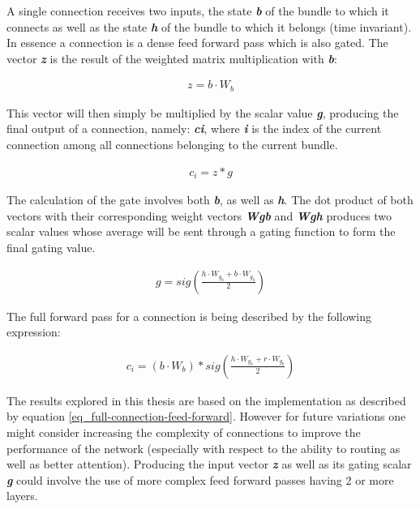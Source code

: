 A single connection receives two inputs, the state \textbf{\textit{b}} of the bundle to which it connects as well as the state \textbf{\textit{h}} of the bundle to which it belongs (time invariant).
In essence a connection is a dense feed forward pass
which is also gated. 
The vector \textbf{\textit{z}} is the result of the
weighted matrix multiplication with \textbf{\textit{b}}:


\begin{align}
z = b \cdot W_b
\end{align}

This vector will then simply be multiplied by the 
scalar value \textbf{\textit{g}}, producing
the final output of a connection, namely: \textbf{\textit{ci}}, where \textbf{\textit{i}} is the index of the current connection among all connections belonging to the current bundle.

\begin{align}
c_i = z * g
\end{align}

The calculation of the gate involves both \textbf{\textit{b}}, as well as \textbf{\textit{h}}.
The dot product of both vectors with their corresponding weight vectors \textbf{\textit{Wgb}}
and \textbf{\textit{Wgh}} produces two scalar
values whose average will be sent through a gating
function to form the final gating value.
 
\begin{align}\label{eq_gate}
    g = sig( \frac{h \cdot W_{g_h} + b \cdot W_{g_b}}{2} )
\end{align}

The full forward pass for a connection is
being described by the following expression:

\begin{align}\label{eq_full-connection-feed-forward}
c_i = (b \cdot W_b) * 
sig( \frac{h \cdot W_{g_h} + r \cdot W_{g_b}}{2} )
\end{align}
 
The results explored in this thesis are based on the implementation as described by equation \ref{eq_full-connection-feed-forward}.
However for future variations one might consider increasing the complexity of
connections to improve the performance of the network (especially with respect to the ability to routing as well as better attention).
Producing the input vector \textit{\textbf{z}} as well as its gating scalar \textit{\textbf{g}} could involve the use of more complex feed forward passes having 2 or more layers.


